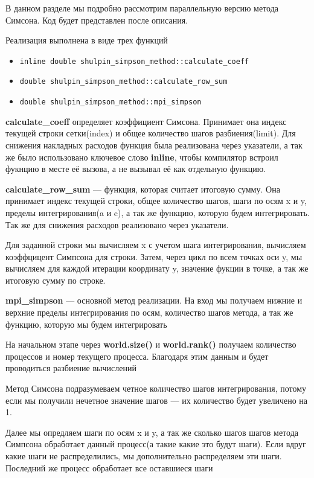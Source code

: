 \documentclass[12pt,a4paper]{article}
\begin{document}
В данном разделе мы подробно рассмотрим параллельную версию метода Симсона. Код будет представлен после описания.

Реализация выполнена в виде трех функций 
\begin{itemize}
    \item \texttt{inline double shulpin\_simpson\_method::calculate\_coeff}
    \item \texttt{double shulpin\_simpson\_method::calculate\_row\_sum}
    \item \texttt{double shulpin\_simpson\_method::mpi\_simpson}
\end{itemize}

\textbf{calculate\_coeff} определяет коэффициент Симсона. Принимает она индекс текущей строки сетки(index) и общее количество шагов разбиения(limit). Для снижения накладных расходов функция была реализована через указатели, а так же было использовано ключевое слово \textbf{inline}, чтобы компилятор встроил фукнцию в месте её вызова, а не вызывал её как отдельную функцию.

\textbf{calculate\_row\_sum} --- функция, которая считает итоговую сумму. Она принимает индекс текущей строки, общее количество шагов, шаги по осям x и y, пределы интегрирования(a и c), а так же функцию, которую будем интегрировать. Так же для снижения расходов реализовано через указатели.

Для заданной строки мы вычисляем x с учетом шага интегрирования, вычисляем коэффцицент Симпсона для строки. Затем, через цикл по всем точках оси y, мы вычисляем для каждой итерации координату y, значение фукции в точке, а так же итоговую сумму по строке.

\textbf{mpi\_simpson} --- основной метод реализации. На вход мы получаем нижние и верхние пределы интегрирования по осям, количество шагов метода, а так же функцию, которую мы будем интегрировать 

На начальном этапе через \textbf{world.size()} и \textbf{world.rank()} получаем количество процессов и номер текущего процесса. Благодаря этим данным и будет проводиться разбиение вычислений

Метод Симсона подразумеваем четное количество шагов интегрирования, потому если мы получили нечетное значение шагов --- их количество будет увеличено на 1.

Далее мы опредляем шаги по осям x и y, а так же сколько шагов шагов метода Симпсона обработает данный процесс(а такие какие это будут шаги). Если вдруг какие шаги не распределились, мы дополнительно распределяем эти шаги. Последний же процесс обработает все оставшиеся шаги
\end{document}
